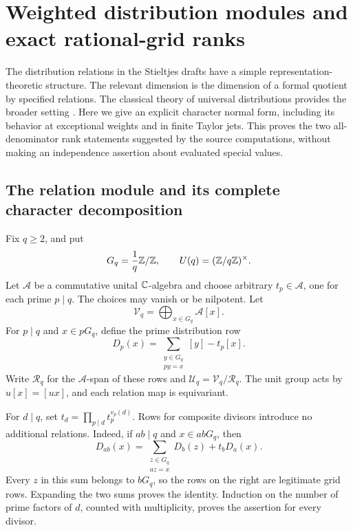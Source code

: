 \section{Weighted distribution modules and exact rational-grid ranks}
\label{dist:sec:distribution}

The distribution relations in the Stieltjes drafts have a simple
representation-theoretic structure. The relevant dimension is the
dimension of a formal quotient by specified relations. The classical
theory of universal distributions provides the broader setting
\cite{dist:Kubert,dist:Ouyang}. Here we give an explicit character normal form,
including its behavior at exceptional weights and in finite Taylor
jets. This proves the two all-denominator rank statements suggested by
the source computations, without making an independence assertion about
evaluated special values.

\subsection{The relation module and its complete character decomposition}

Fix \(q\geq2\), and put
\[
 G_q=\frac1q\mathbb{Z}/\mathbb{Z},\qquad U(q)=(\mathbb{Z}/q\mathbb{Z})^\times.
\]
Let \(\mathcal A\) be a commutative unital \(\mathbb C\)-algebra and choose
arbitrary \(t_p\in\mathcal A\), one for each prime \(p\mid q\).
The choices may vanish or be nilpotent. Let
\[
 \mathcal V_q=\bigoplus_{x\in G_q}\mathcal A[x].
\]
For \(p\mid q\) and \(x\in pG_q\), define the prime distribution row
\begin{equation}
 D_p(x)=\sum_{\substack{y\in G_q\\py=x}}[y]-t_p[x].
 \label{dist:eq:dist-prime-row}
\end{equation}
Write \(\mathcal R_q\) for the \(\mathcal A\)-span of these rows and
\(\mathcal U_q=\mathcal V_q/\mathcal R_q\).
The unit group acts by \(u[x]=[ux]\), and each relation map is
equivariant.

For \(d\mid q\), set \(t_d=\prod_{p\mid d}t_p^{v_p(d)}\).
Rows for composite divisors introduce no additional relations. Indeed,
if \(ab\mid q\) and \(x\in abG_q\), then
\begin{equation}
 D_{ab}(x)=
 \sum_{\substack{z\in G_q\\az=x}}D_b(z)+t_bD_a(x).
 \label{dist:eq:dist-composite-row}
\end{equation}
Every \(z\) in this sum belongs to \(bG_q\), so the rows on the right
are legitimate grid rows. Expanding the two sums proves the identity.
Induction on the number of prime factors of \(d\), counted with
multiplicity, proves the assertion for every divisor.

